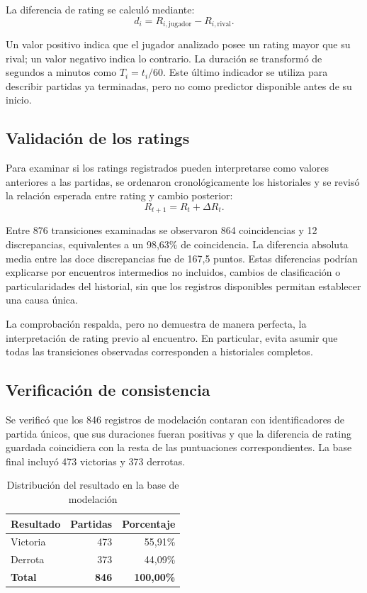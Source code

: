 \documentclass[12pt,a4paper]{article}
\begin{document}
La diferencia de rating se calculó mediante:
\begin{equation}
d_i=R_{i,\mathrm{jugador}}-R_{i,\mathrm{rival}}.
\label{eq:diferencia}
\end{equation}

Un valor positivo indica que el jugador analizado posee un rating mayor que su rival; un valor negativo indica lo contrario. La duración se transformó de segundos a minutos como $T_i=t_i/60$. Este último indicador se utiliza para describir partidas ya terminadas, pero no como predictor disponible antes de su inicio.

\subsection{Validación de los ratings}

Para examinar si los ratings registrados pueden interpretarse como valores anteriores a las partidas, se ordenaron cronológicamente los historiales y se revisó la relación esperada entre rating y cambio posterior:
\begin{equation}
R_{t+1}=R_t+\Delta R_t.
\end{equation}

Entre 876 transiciones examinadas se observaron 864 coincidencias y 12 discrepancias, equivalentes a un 98,63\% de coincidencia. La diferencia absoluta media entre las doce discrepancias fue de 167,5 puntos. Estas diferencias podrían explicarse por encuentros intermedios no incluidos, cambios de clasificación o particularidades del historial, sin que los registros disponibles permitan establecer una causa única.

La comprobación respalda, pero no demuestra de manera perfecta, la interpretación de rating previo al encuentro. En particular, evita asumir que todas las transiciones observadas corresponden a historiales completos.

\subsection{Verificación de consistencia}

Se verificó que los 846 registros de modelación contaran con identificadores de partida únicos, que sus duraciones fueran positivas y que la diferencia de rating guardada coincidiera con la resta de las puntuaciones correspondientes. La base final incluyó 473 victorias y 373 derrotas.

\begin{table}[htbp]
\centering
\caption{Distribución del resultado en la base de modelación}
\label{tab:resultados_base}
\begin{tabular}{lrr}
\toprule
\textbf{Resultado} & \textbf{Partidas} & \textbf{Porcentaje}\\
\midrule
Victoria & 473 & 55,91\%\\
Derrota & 373 & 44,09\%\\
\midrule
\textbf{Total} & \textbf{846} & \textbf{100,00\%}\\
\bottomrule
\end{tabular}
\end{table}
\end{document}
